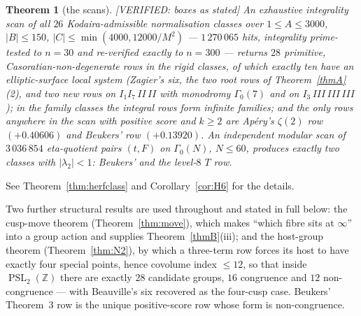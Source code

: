 \documentclass[11pt,reqno]{amsart}
\theoremstyle{plain}
\theoremstyle{definition}
\theoremstyle{remark}
\theoremstyle{plain}
\newtheorem{namedthm}{Theorem}
\newcommand{\Z}{\mathbb{Z}}
\DeclareMathOperator{\PSL}{PSL}
\newcommand{\VerifiedR}[1]{\textup{\textsf{[VERIFIED: #1]}}}
\begin{document}
\begin{namedthm}[the scans]\label{thmC}
\VerifiedR{boxes as stated} An exhaustive integrality scan of
all $26$ Kodaira-admissible normalisation classes over $1\le A\le3000$,
$|B|\le150$, $|C|\le\min(4000,12000/M^2)$ --- $1\,270\,065$ hits, integrality
prime-tested to $n=30$ and re-verified exactly to $n=300$ --- returns $28$
primitive, Casoratian-non-degenerate rows in the rigid classes, of which exactly
ten have an elliptic-surface local system (Zagier's six, the two root rows of
Theorem~\ref{thmA}(2), and two new rows on $I_1I_7\,II\,II$ with monodromy
$\Gamma_0(7)$ and on $I_3\,III\,III\,III$); in the family classes the integral
rows form infinite families; and the only rows anywhere in the scan with positive
score and $k\ge2$ are Ap\'ery's $\zeta(2)$ row $(+0.40606)$ and Beukers' row
$(+0.13920)$. An independent modular scan of $3\,036\,854$ eta-quotient pairs
$(t,F)$ on $\Gamma_0(N)$, $N\le60$, produces exactly two classes with
$|\lambda_2|<1$: Beukers' and the level-$8$ $T$ row.
\end{namedthm}

\noindent
See Theorem~\ref{thm:herfclass} and Corollary~\ref{cor:H6} for the details.

Two further structural results are used throughout and stated in full below: the
cusp-move theorem (Theorem~\ref{thm:move}), which makes ``which fibre sits at
$\infty$'' into a group action and supplies Theorem~\ref{thmB}(iii); and the
host-group theorem (Theorem~\ref{thm:N2}), by which a three-term row forces its
host to have exactly four special points, hence covolume index $\le12$, so that
inside $\PSL_2(\Z)$ there are exactly $28$ candidate groups, $16$ congruence and
$12$ non-congruence --- with Beauville's six recovered as the four-cusp case.
Beukers' Theorem~3 row is the unique positive-score row whose form is
non-congruence.
\end{document}

